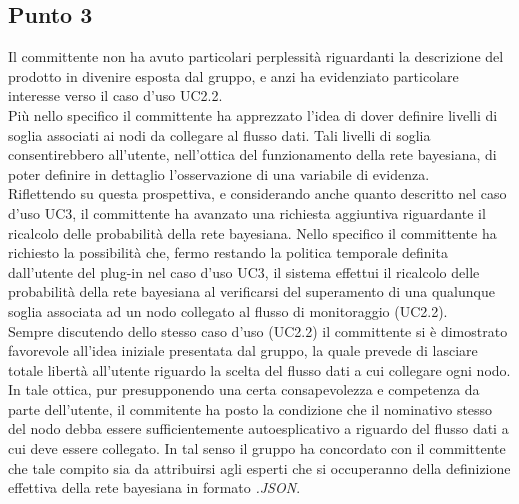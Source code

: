 \subsection{Punto 3}
Il committente non ha avuto particolari perplessità riguardanti la descrizione del prodotto in divenire esposta dal gruppo, e anzi ha evidenziato particolare interesse verso il caso d'uso UC2.2.\\
Più nello specifico il committente ha apprezzato l'idea di dover definire livelli di soglia associati ai nodi da collegare al flusso dati. Tali livelli di soglia consentirebbero all'utente, nell'ottica del funzionamento della rete bayesiana, di poter definire in dettaglio l'osservazione di una variabile di evidenza.\\
Riflettendo su questa prospettiva, e considerando anche quanto descritto nel caso d'uso UC3, il committente ha avanzato una richiesta aggiuntiva riguardante il ricalcolo delle probabilità della rete bayesiana.
Nello specifico il committente ha richiesto la possibilità che, fermo restando la politica temporale definita dall'utente del plug-in nel caso d'uso UC3, il sistema effettui il ricalcolo delle probabilità della rete bayesiana al verificarsi del superamento di una qualunque soglia associata ad un nodo collegato al flusso di monitoraggio (UC2.2).\\
Sempre discutendo dello stesso caso d'uso (UC2.2) il committente si è dimostrato favorevole all'idea iniziale presentata dal gruppo, la quale prevede di lasciare totale libertà all'utente riguardo la scelta del flusso dati  a cui collegare ogni nodo. In tale ottica, pur presupponendo una certa consapevolezza e competenza da parte dell'utente, il commitente ha posto la condizione che il nominativo stesso del nodo debba essere sufficientemente autoesplicativo a riguardo del flusso dati a cui deve essere collegato. In tal senso il gruppo ha concordato con il committente che tale compito sia da attribuirsi agli esperti che si occuperanno della definizione effettiva della rete bayesiana in formato \textit{.JSON}\glossario.
